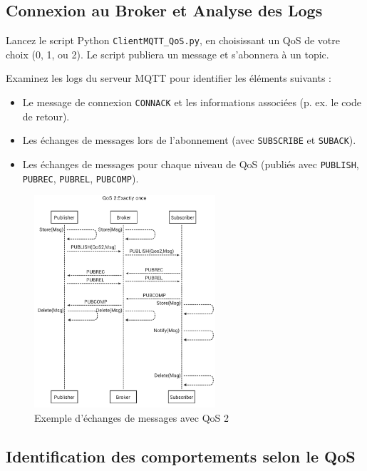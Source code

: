\documentclass{article}
\begin{document}
\subsection{Connexion au Broker et Analyse des Logs}

Lancez le script Python \texttt{ClientMQTT\_QoS.py}, en choisissant un QoS de votre choix (0, 1, ou 2). Le script publiera un message et s'abonnera à un topic. 

Examinez les logs du serveur MQTT pour identifier les éléments suivants :

\begin{itemize}
    \item Le message de connexion \texttt{CONNACK} et les informations associées (p. ex. le code de retour).
    \item Les échanges de messages lors de l'abonnement (avec \texttt{SUBSCRIBE} et \texttt{SUBACK}).
    \item Les échanges de messages pour chaque niveau de QoS (publiés avec \texttt{PUBLISH}, \texttt{PUBREC}, \texttt{PUBREL}, \texttt{PUBCOMP}).
\end{itemize}

\begin{figure}[H]
    \centering
    \includegraphics[width=0.6\textwidth]{Images/QoS2.png}
    \caption{Exemple d'échanges de messages avec QoS 2}
\end{figure}

\subsection{Identification des comportements selon le QoS}
\end{document}
